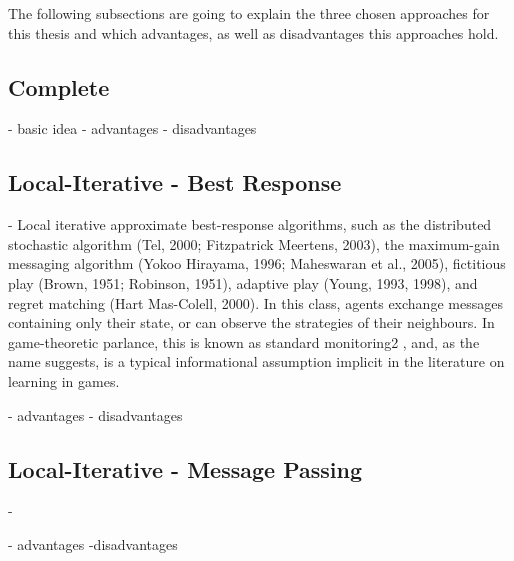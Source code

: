     The following subsections are going to explain the three chosen approaches for this thesis and which advantages, as well as disadvantages this approaches hold.
    
    \cite{Likhachev}
    
\subsection{Complete}

\cite{Chapman2011}

    - basic idea
    - advantages
    - disadvantages

\subsection{Local-Iterative - Best Response}

\cite{Chapman2011}
\cite{Maheswaran} %

    - Local iterative approximate best-response algorithms, such as the distributed stochastic algorithm
(Tel, 2000; Fitzpatrick  Meertens, 2003), the maximum-gain messaging algorithm (Yokoo 
Hirayama, 1996; Maheswaran et al., 2005), fictitious play (Brown, 1951; Robinson, 1951),
adaptive play (Young, 1993, 1998), and regret matching (Hart  Mas-Colell, 2000). In this class,
agents exchange messages containing only their state, or can observe the strategies of their
neighbours. In game-theoretic parlance, this is known as standard monitoring2
, and, as the name
suggests, is a typical informational assumption implicit in the literature on learning in games.


    - advantages
    - disadvantages

\subsection{Local-Iterative - Message Passing}
    
    \cite{Chapman2011}
    - 
    
    - advantages
    -disadvantages